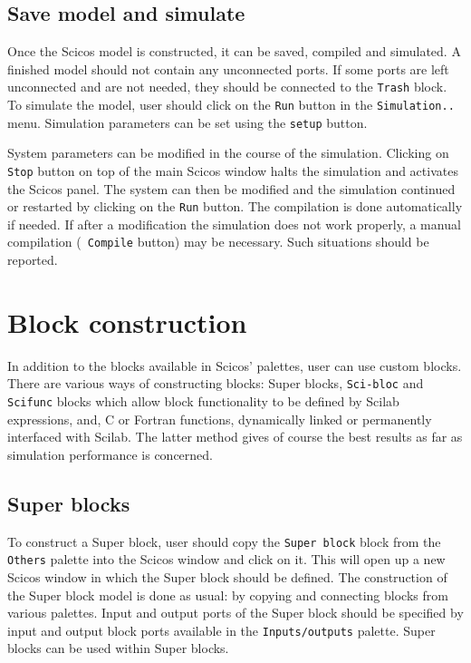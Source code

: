 \subsection{Save model and simulate}
Once the Scicos   model is constructed, it can be saved, compiled and 
simulated. A finished model should not contain any unconnected ports.
If some ports are left unconnected and are not needed, they should be
connected to the {\tt Trash} block.
To simulate the model, user should click on the {\tt Run} button in
the {\tt Simulation..} menu. Simulation parameters can be set using
the {\tt setup} button. 

System parameters can be modified in the course of the simulation.
Clicking on {\tt Stop} button on top of the main Scicos  window halts the
simulation and activates the Scicos 
panel. The system can then be modified and the simulation 
continued or restarted by clicking on the {\tt Run} button. The
compilation is done automatically if needed. If after a modification
the simulation does not work properly, a manual compilation ({\tt
Compile} button) may be necessary. Such situations should be reported.

\section{Block construction}
In addition to the blocks available in Scicos' palettes, user can use
custom blocks. There are various ways of constructing blocks: Super
blocks, {\tt Sci-bloc} and {\tt Scifunc} blocks which allow block
functionality to be defined by Scilab expressions, and, 
C or Fortran functions, dynamically linked or
permanently interfaced with Scilab. The latter method gives of course
the best results as far as simulation performance is concerned.

\subsection{Super blocks}
To construct a Super block, user should copy the {\tt Super block}
block from the {\tt Others} palette into the Scicos   window and click
on it. This will open up a new Scicos   window in which the Super block
should be defined. 
The construction of the Super block model is done as usual: by copying and
connecting blocks from various palettes. Input and output ports of the
Super block should be specified by input and output block ports available 
in the {\tt Inputs/outputs} palette. Super blocks can be used within
Super blocks. 

